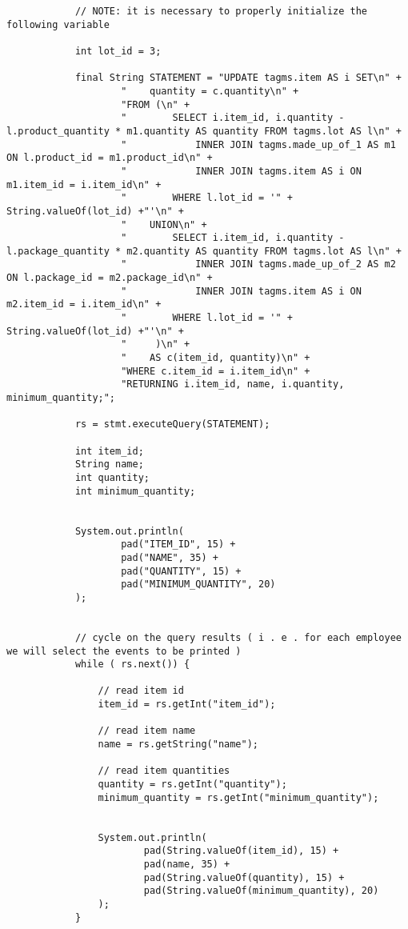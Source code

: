 \begin{lstlisting}
            // NOTE: it is necessary to properly initialize the following variable

            int lot_id = 3;

            final String STATEMENT = "UPDATE tagms.item AS i SET\n" +
                    "    quantity = c.quantity\n" +
                    "FROM (\n" +
                    "        SELECT i.item_id, i.quantity - l.product_quantity * m1.quantity AS quantity FROM tagms.lot AS l\n" +
                    "            INNER JOIN tagms.made_up_of_1 AS m1 ON l.product_id = m1.product_id\n" +
                    "            INNER JOIN tagms.item AS i ON m1.item_id = i.item_id\n" +
                    "        WHERE l.lot_id = '" + String.valueOf(lot_id) +"'\n" +
                    "    UNION\n" +
                    "        SELECT i.item_id, i.quantity - l.package_quantity * m2.quantity AS quantity FROM tagms.lot AS l\n" +
                    "            INNER JOIN tagms.made_up_of_2 AS m2 ON l.package_id = m2.package_id\n" +
                    "            INNER JOIN tagms.item AS i ON m2.item_id = i.item_id\n" +
                    "        WHERE l.lot_id = '" + String.valueOf(lot_id) +"'\n" +
                    "     )\n" +
                    "    AS c(item_id, quantity)\n" +
                    "WHERE c.item_id = i.item_id\n" +
                    "RETURNING i.item_id, name, i.quantity, minimum_quantity;";

            rs = stmt.executeQuery(STATEMENT);

            int item_id;
            String name;
            int quantity;
            int minimum_quantity;


            System.out.println(
                    pad("ITEM_ID", 15) +
                    pad("NAME", 35) +
                    pad("QUANTITY", 15) +
                    pad("MINIMUM_QUANTITY", 20)
            );


            // cycle on the query results ( i . e . for each employee we will select the events to be printed )
            while ( rs.next()) {

                // read item id
                item_id = rs.getInt("item_id");

                // read item name
                name = rs.getString("name");

                // read item quantities
                quantity = rs.getInt("quantity");
                minimum_quantity = rs.getInt("minimum_quantity");


                System.out.println(
                        pad(String.valueOf(item_id), 15) +
                        pad(name, 35) +
                        pad(String.valueOf(quantity), 15) +
                        pad(String.valueOf(minimum_quantity), 20)
                );
            }



\end{lstlisting}
